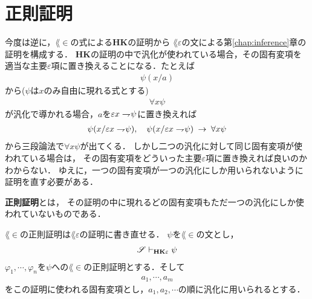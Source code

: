 \section{正則証明}
	今度は逆に，$\lang{\in}$の式による{\bf HK}の証明から
	$\lang{\varepsilon}$の文による第\ref{chap:inference}章の証明を構成する．
	{\bf HK}の証明の中で汎化が使われている場合，その固有変項を
	適当な主要$\varepsilon$項に置き換えることになる．たとえば
	\begin{align}
		\psi(x/a)
	\end{align}
	から($\psi$は$x$のみ自由に現れる式とする)
	\begin{align}
		\forall x \psi
	\end{align}
	が汎化で導かれる場合，$a$を$\varepsilon x \rightharpoondown\hspace{-0.25em} \psi$に置き換えれば
	\begin{align}
		\psi(x/\varepsilon x \rightharpoondown\hspace{-0.25em} \psi), 
		\quad \psi(x/\varepsilon x \rightharpoondown\hspace{-0.25em} \psi) \hspace{0.25em}\rightarrow\hspace{0.25em} \forall x \psi
	\end{align}
	から三段論法で$\forall x \psi$が出てくる．
	しかし二つの汎化に対して同じ固有変項が使われている場合は，
	その固有変項をどういった主要$\varepsilon$項に置き換えれば良いのかわからない．
	ゆえに，一つの固有変項が一つの汎化にしか用いられないように証明を直す必要がある．
	
	\begin{screen}
		\begin{metadfn}[正則証明]
			{\bf 正則証明}とは，
			その証明の中に現れるどの固有変項もただ一つの汎化にしか使われていないものである．
		\end{metadfn}
	\end{screen}
	
	\begin{screen}
		\begin{metathm}[どんな証明も正則化できる]
			
		\end{metathm}
	\end{screen}
	
	$\lang{\in}$の正則証明は$\lang{\varepsilon}$の証明に書き直せる．
	$\psi$を$\lang{\in}$の文とし，
	\begin{align}
		\mathscr{S} \vdash_{{\scriptsize \mbox{{\bf HK$\varepsilon$}}}} \psi
	\end{align}
	$\varphi_{1},\cdots,\varphi_{n}$を$\psi$への$\lang{\in}$の正則証明とする．そして
	\begin{align}
		a_{1},\cdots,a_{m}
	\end{align}
	をこの証明に使われる固有変項とし，$a_{1},a_{2},\cdots$の順に汎化に用いられるとする．
	
